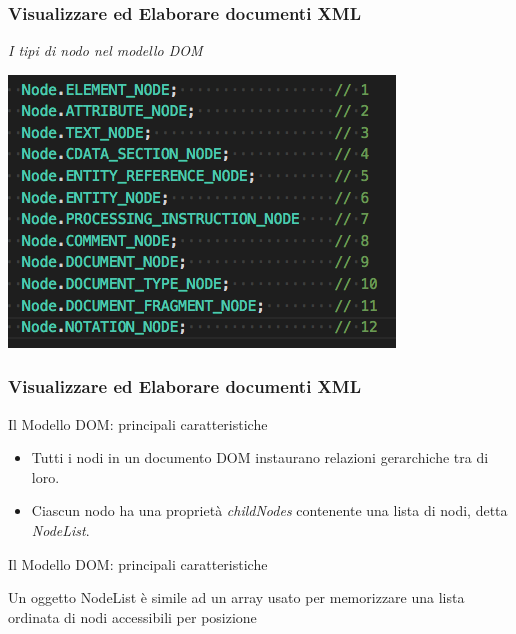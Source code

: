 \begin{frame}
    \frametitle{Visualizzare ed Elaborare documenti XML}
    \addtocounter{nframe}{1}
    

     \textit{I tipi di nodo nel modello DOM}

        \begin{center}
            \includegraphics[width=.85\textwidth]{imgs/nodetypes.png}
        \end{center}
     
\end{frame}

\begin{frame}
    \frametitle{Visualizzare ed Elaborare documenti XML}
    \addtocounter{nframe}{1}
    

     \begin{block}{Il Modello DOM: principali caratteristiche}
        \begin{itemize}
            \item Tutti i nodi in un documento DOM instaurano relazioni gerarchiche tra di loro.
            \item Ciascun nodo ha una proprietà \textit{childNodes} contenente una lista di nodi, detta \textit{NodeList}.
        \end{itemize}
     \end{block}

     \begin{block}{Il Modello DOM: principali caratteristiche}

            Un oggetto NodeList è simile ad un array usato per memorizzare una lista ordinata di nodi accessibili per posizione
       
     \end{block}

\end{frame}

